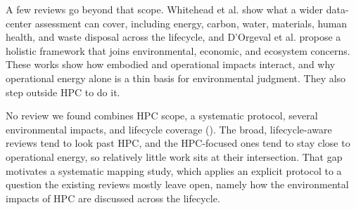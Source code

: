 A few reviews go beyond that scope. Whitehead et al. \parencite{whitehead2014Assessing, whitehead2015Assessing} show what a wider data-center assessment can cover, including energy, carbon, water, materials, human health, and waste disposal across the lifecycle, and D'Orgeval et al. \parencite{dorgeval2024Improved} propose a holistic framework that joins environmental, economic, and ecosystem concerns. These works show how embodied and operational impacts interact, and why operational energy alone is a thin basis for environmental judgment. They also step outside HPC to do it.

No review we found combines HPC scope, a systematic protocol, several environmental impacts, and lifecycle coverage (). The broad, lifecycle-aware reviews tend to look past HPC, and the HPC-focused ones tend to stay close to operational energy, so relatively little work sits at their intersection. That gap motivates a systematic mapping study, which applies an explicit protocol to a question the existing reviews mostly leave open, namely how the environmental impacts of HPC are discussed across the lifecycle.

